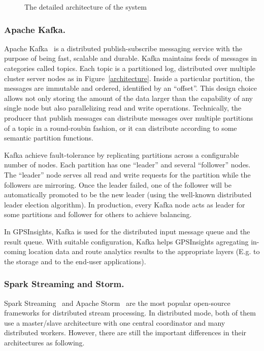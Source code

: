 \documentclass{acm_proc_article-sp}
\begin{document}
\begin{figure}[h]
\centering
{}
\caption{The detailed architecture of the system}
\end{figure}

\subsubsection{Apache Kafka.} 

Apache Kafka~\cite{kafkapaper,kafkaweb} is a distributed publish-subscribe messaging service with the purpose of being fast, scalable and durable. Kafka maintains feeds of messages in categories called topics. Each topic is a partitioned log, distributed over multiple cluster server nodes as in Figure~\ref{architecture}. Inside a particular partition, the messages are immutable and ordered, identified by an ``offset''. This design choice allows not only storing the amount of the data larger than the capability of any single node but also parallelizing read and write operations. Technically, the producer that publish messages can distribute messages over multiple partitions of a topic in a round-roubin fashion, or it can distribute according to some semantic partition functions.

Kafka achieve fault-tolerance by replicating partitions across a configurable number of nodes. Each partition has one ``leader'' and several ``follower'' nodes. The ``leader'' node serves all read and write requests for the partition while the followers are mirroring. Once the leader failed, one of the follower will be automatically promoted to be the new leader (using the well-known distributed leader election algorithm). In production, every Kafka node acts as leader for some partitions and follower for others to achieve balancing. 

In GPSInsights, Kafka is used for the distributed input message queue and the result queue. With suitable configuration, Kafka helps GPSInsights agregating in-coming location data and route analytics results to the appropriate layers (E.g. to the storage and to the end-user applications).

\subsubsection{Spark Streaming and Storm.}

Spark Streaming~\cite{learningsparkbook,sparkstreamingweb} and Apache Storm~\cite{stormappliedbook,apachestormweb} are the most popular open-source frameworks for distributed stream processing. In distributed mode, both of them use a master/slave architecture with one central coordinator and many distributed workers. However, there are still the important differences in their architectures as following.
\end{document}
